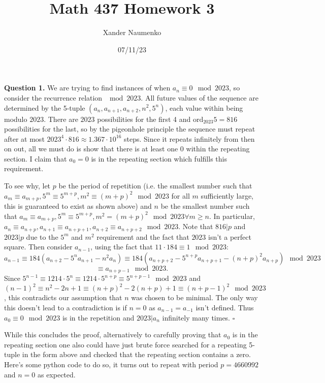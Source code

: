 \documentclass[letterpaper, reqno,11pt]{article}
\begin{document}
\title{Math 437 Homework 3}
\date{07/11/23}
\author{Xander Naumenko}
\maketitle

{\medskip\noindent\bf Question 1.} We are trying to find instances of when $a_n\equiv 0\mod 2023$, so consider the recurrence relation $\mod 2023$. All future values of the sequence are determined by the 5-tuple $(a_n,a_{n+1},a_{n+2},n^2,5^{n})$, each value within being modulo $2023$. There are $2023$ possibilities for the first 4 and $\text{ord}_{2023}5=816$ possibilities for the last, so by the pigeonhole principle the sequence must repeat after at most $2023^{4}\cdot 816\approx 1.367\cdot 10^{16}$ steps. Since it repeats infinitely from then on out, all we must do is show that there is at least one 0 within the repeating section. I claim that $a_0=0$ is in the repeating section which fulfills this requirement.

To see why, let $p$ be the period of repetition (i.e. the smallest number such that $a_m\equiv a_{m+p}, 5^{m}\equiv 5^{m+p}, m^2\equiv (m+p)^2\mod 2023$ for all $m$ sufficiently large, this is guaranteed to exist as shown above) and $n$ be the smallest number such that $a_{m}\equiv a_{m+p},5^{m}\equiv 5^{m+p},m^2=(m+p)^2\mod 2023\forall m\geq n$. In particular, $a_{n}\equiv a_{n+p},a_{n+1}\equiv a_{n+p+1},a_{n+2}\equiv a_{n+p+2}\mod 2023$. Note that $816|p$ and $2023|p$ due to the $5^{m}$ and $m^2$ requirement and the fact that $2023$ isn't a perfect square. Then consider $a_{n-1}$, using the fact that $11\cdot 184\equiv 1\mod 2023$:
\[
a_{n-1}\equiv 184\left( a_{n+2}-5^{n}a_{n+1}-n^2a_{n} \right)\equiv 184\left( a_{n+p+2}-5^{n+p}a_{n+p+1}-(n+p)^2a_{n+p} \right) \mod 2023
\]
\[
\equiv a_{n+p-1}\mod 2023
.\]
Since $5^{n-1}\equiv 1214\cdot 5^{n}\equiv 1214\cdot 5^{n+p}\equiv 5^{n+p-1}\mod 2023$ and $(n-1)^2\equiv n^2-2n+1\equiv (n+p)^2-2(n+p)+1\equiv (n+p-1)^2\mod 2023$, this contradicts our assumption that $n$ was chosen to be minimal. The only way this doesn't lead to a contradiction is if $n=0$ as $a_{n-1}=a_{-1}$ isn't defined. Thus $a_0\equiv 0\mod 2023$ is in the repetition and $2023|a_n$ infinitely many times. $\square$

While this concludes the proof, alternatively to carefully proving that $a_0$ is in the repeating section one also could have just brute force searched for a repeating 5-tuple in the form above and checked that the repeating section contains a zero. Here's some python code to do so, it turns out to repeat with period $p=4660992$ and $n=0$ as expected.
\end{document}
